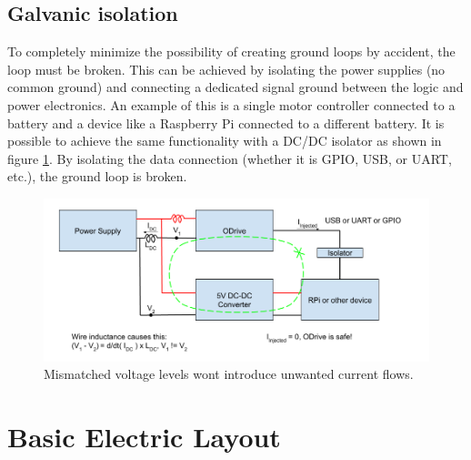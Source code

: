     \subsection{Galvanic isolation}
    
    To completely minimize the possibility of creating ground loops by accident, the loop must be broken. This can be achieved by isolating the power supplies (no common ground) and connecting a dedicated signal ground between the logic and power electronics. An example of this is a single motor controller connected to a battery and a device like a Raspberry Pi connected to a different battery. It is possible to achieve the same functionality with a DC/DC isolator as shown in figure \ref{fig:ground_loop_fix}. By isolating the data connection (whether it is GPIO, USB, or UART, etc.), the ground loop is broken.
    
    \begin{figure}[h] %
        \includegraphics[width=\textwidth]{contents/figures/ground_loop_fix.png}
        \caption{Mismatched voltage levels wont introduce unwanted current flows.}
        \label{fig:ground_loop_fix}
    \end{figure}

    \clearpage %
    
\section{Basic Electric Layout}

